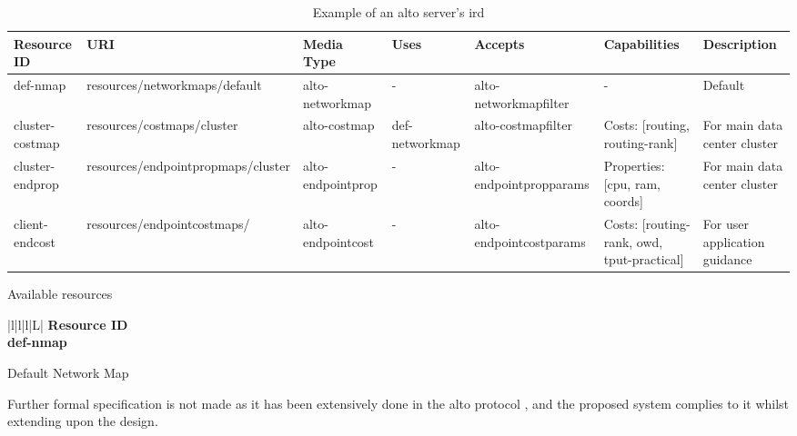 \begin{table}[H]
        \begin{subtable}{1\linewidth}
        \centering
        \hspace*{-8em}
        \tiny
        \begin{tabular}{|l|l|l|l|l|l|l|}
        \hline
        Resource ID             & URI                                & Media Type        & Uses           & Accepts                 & Capabilities                                              & Description                                   \\ \hline
        def-nmap          & resources/networkmaps/default      & alto-networkmap   & -              & alto-networkmapfilter   & -                                                         & Default                           \\ \hline
        cluster-costmap         & resources/costmaps/cluster         & alto-costmap      & def-networkmap & alto-costmapfilter      & Costs: {[}routing, routing-rank{]} & For main data center cluster         \\ \hline
        cluster-endprop   & resources/endpointpropmaps/cluster & alto-endpointprop & -              & alto-endpointpropparams & Properties: {[}cpu, ram, coords{]} & For main data center cluster \\ \hline
        client-endcost & resources/endpointcostmaps/        & alto-endpointcost & -              & alto-endpointcostparams & Costs: {[}routing-rank, owd, tput-practical{]}            & For user application guidance       \\ \hline
        \end{tabular}
        \caption{Available resources}
        \label{table:ird-resources}
        \end{subtable}
        \begin{subtable}{1\linewidth}
        \centering
        \begin{tabular}{|l|l|l|L|}
        \hline
        \bf{Resource ID} \\ \hline
        def-nmap         \\ \hline
        \end{tabular}
        \caption{Default Network Map}
        \label{table:ird-default-network-map}
        \end{subtable}

    \caption{Example of an \gls{alto} server's \gls{ird}}
    \label{table:ird-example}
\end{table}

Further formal specification is not made as it has been extensively done in the \gls{alto} protocol \cite{alto-protocol}, and the proposed system complies to it whilst extending upon the design.

